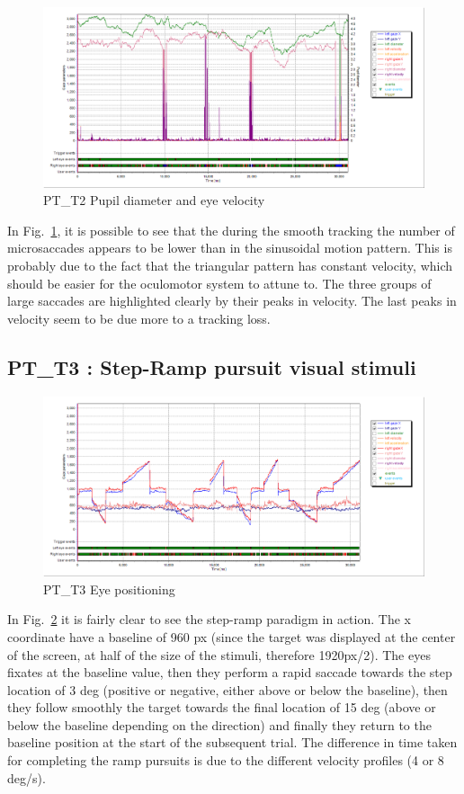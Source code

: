 \begin{figure}[h]
  \centering
  \includegraphics[width=.8\textwidth]{figures/graphs/PT_T2(triangular)_VP.png}
  \caption[PT\_T2 Eye pupil velocity]{PT\_T2 Pupil diameter and eye velocity}
  \label{fig:PT_T2_vel}
\end{figure}

In Fig.~\ref{fig:PT_T2_vel}, it is possible to see that the during the smooth tracking the number of microsaccades appears to be lower than in the sinusoidal motion pattern. This is probably due to the fact that the triangular pattern has constant velocity, which should be easier for the oculomotor system to attune to. The three groups of large saccades are highlighted clearly by their peaks in velocity. The last peaks in velocity seem to be due more to a tracking loss.



\subsection{PT\_T3 : Step-Ramp pursuit visual stimuli}
\label{sec:PT_T3}

\begin{figure}[h]
  \centering
  \includegraphics[width=.8\textwidth]{figures/graphs/PT_T3(stepRamp)_XY.png}
  \caption[PT\_T3 Eye positioning]{PT\_T3 Eye positioning}
  \label{fig:PT_T3_pos}
\end{figure}

In Fig.~\ref{fig:PT_T3_pos} it is fairly clear to see the step-ramp paradigm in action. The x coordinate have a baseline of 960 px (since the target was displayed at the center of the screen, at half of the size of the stimuli, therefore 1920px/2). The eyes fixates at the baseline value, then they perform a rapid saccade towards the step location of 3 deg (positive or negative, either above or below the baseline), then they follow smoothly the target towards the final location of 15 deg (above or below the baseline depending on the direction) and finally they return to the baseline position at the start of the subsequent trial. The difference in time taken for completing the ramp pursuits is due to the different velocity profiles (4 or 8 deg/s).


